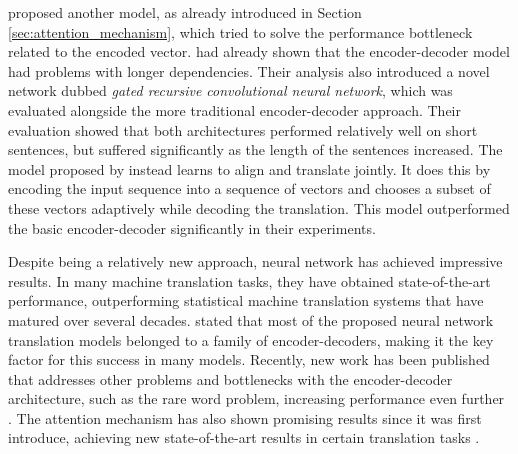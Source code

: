 \cite{bahdanau2014neural} proposed another model, as already introduced in Section \ref{sec:attention_mechanism}, which tried to solve the performance bottleneck related to the encoded vector. \cite{cho2014properties} had already shown that the encoder-decoder model had problems with longer dependencies. Their analysis also introduced a novel network dubbed \textit{gated recursive convolutional neural network}, which was evaluated alongside the more traditional encoder-decoder approach. Their evaluation showed that both architectures performed relatively well on short sentences, but suffered significantly as the length of the sentences increased. The model proposed by \cite{bahdanau2014neural} instead learns to align and translate jointly. It does this by encoding the input sequence into a sequence of vectors and chooses a subset of these vectors adaptively while decoding the translation. This model outperformed the basic encoder-decoder significantly in their experiments.

Despite being a relatively new approach, neural network has achieved impressive results. In many machine translation tasks, they have obtained state-of-the-art performance, outperforming statistical machine translation systems that have matured over several decades. \cite{bahdanau2014neural} stated that most of the proposed neural network translation models belonged to a family of encoder-decoders, making it the key factor for this success in many models. Recently, new work has been published that addresses other problems and bottlenecks with the encoder-decoder architecture, such as the rare word problem, increasing performance even further \citep{sennrich2015neural}. The attention mechanism has also shown promising results since it was first introduce, achieving new state-of-the-art results in certain translation tasks \citep{luong2015effective}.